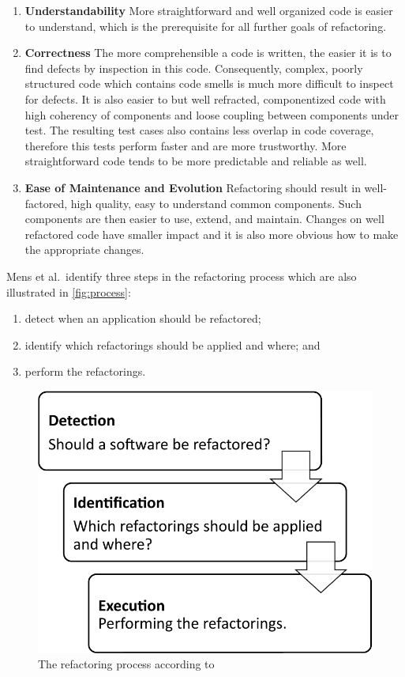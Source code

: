 \documentclass[conference,compsoc,a4paper]{IEEEtran}
\begin{document}
\begin{enumerate}
  \item \textbf{Understandability}
  More straightforward and well organized code is easier to understand, which is the prerequisite for all further goals of refactoring.
  \item \textbf{Correctness}
  The more comprehensible a code is written, the easier it is to find defects by inspection in this code. Consequently, complex, poorly structured code which contains code smells is much more difficult to inspect for defects.
  It is also easier to but well refracted, componentized code with high coherency of components and loose coupling between components under test. The resulting test cases also contains less overlap in code coverage, therefore this tests perform faster and are more trustworthy. More straightforward code tends to be more predictable and reliable as well.
  \item \textbf{Ease of Maintenance and Evolution}
  Refactoring should result in well-factored, high quality, easy to understand common components. Such components are then easier to use, extend, and maintain.
  Changes on well refactored code have smaller impact and it is also more obvious how to make the appropriate changes.
\end{enumerate}

Mens et al.\ identify three steps in the refactoring process \cite{DBLP:conf/iwpse/MensTM03} which are also illustrated 
in \autoref{fig:process}:
\begin{enumerate}
  \item detect when an application should be refactored;
  \item identify which refactorings should be applied and where; and
  \item perform the refactorings.
\end{enumerate}

\begin{figure}[htb]
  \centering
  \includegraphics[width=0.8\linewidth]{figures/process}
  \caption{The refactoring process according to \cite{DBLP:conf/iwpse/MensTM03}}
  \label{fig:process}
\end{figure}
\end{document}
